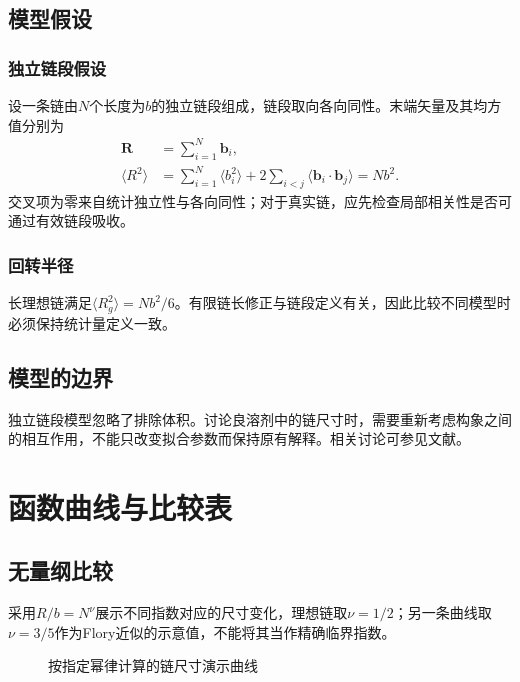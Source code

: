 \subsection{模型假设}
\subsubsection{独立链段假设}
设一条链由$N$个长度为$b$的独立链段组成，链段取向各向同性。末端矢量及其均方值分别为
\begin{align}
  \boldsymbol{R} &= \sum_{i=1}^{N}\boldsymbol{b}_i,\\
  \langle R^2\rangle &= \sum_{i=1}^{N}\langle b_i^2\rangle
  +2\sum_{i<j}\langle\boldsymbol{b}_i\cdot\boldsymbol{b}_j\rangle=Nb^2.
\end{align}
交叉项为零来自统计独立性与各向同性；对于真实链，应先检查局部相关性是否可通过有效链段吸收。

\subsubsection{回转半径}
长理想链满足$\langle R_g^2\rangle=Nb^2/6$。有限链长修正与链段定义有关，因此比较不同模型时必须保持统计量定义一致。

\subsection{模型的边界}
独立链段模型忽略了排除体积。讨论良溶剂中的链尺寸时，需要重新考虑构象之间的相互作用，不能只改变拟合参数而保持原有解释。相关讨论可参见文献\cite{degennes1979}。


\section{函数曲线与比较表}
\subsection{无量纲比较}
采用$R/b=N^\nu$展示不同指数对应的尺寸变化，理想链取$\nu=1/2$；另一条曲线取$\nu=3/5$作为Flory近似的示意值，不能将其当作精确临界指数。
\begin{figure}[htbp]
  \centering
  \caption{按指定幂律计算的链尺寸演示曲线}
  \label{fig:scaling}
\end{figure}

